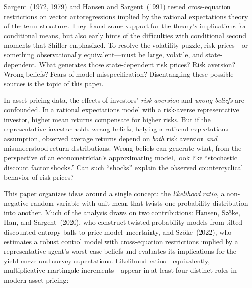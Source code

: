 \documentclass[12pt]{article}
\theoremstyle{definition}
\begin{document}
Sargent~(1972, 1979) and Hansen and Sargent~(1991) tested cross-equation restrictions on vector autoregressions implied by the rational expectations theory of the term structure. They found some support for the theory's implications for conditional means, but also early hints of the difficulties with conditional second moments that Shiller emphasized. To resolve the volatility puzzle, risk prices---or something observationally equivalent---must be large, volatile, and state-dependent. What generates those state-dependent risk prices? Risk aversion? Wrong beliefs? Fears of model misspecification? Disentangling these possible sources is the topic of this paper.

In asset pricing data, the effects of investors' \emph{risk aversion} and \emph{wrong beliefs} are
confounded.  In a rational expectations model with a
risk-averse representative investor, higher mean returns compensate for
higher risks.  But if the representative investor holds wrong beliefs, belying a rational expectations assumption,
observed average returns depend on \emph{both} risk aversion \emph{and}
misunderstood return distributions.  Wrong beliefs can generate what, from the perspective of an econometrician's approximating model, look
like ``stochastic discount factor shocks.'' Can such ``shocks'' explain the observed countercyclical behavior of risk prices?


This paper organizes ideas around a single concept: the
\emph{likelihood ratio}, a non-negative random variable with unit mean
that twists one probability distribution into another.
Much of the analysis draws on two contributions:
Hansen, Sz\H{o}ke, Han, and Sargent~(2020), who construct
twisted probability models from tilted discounted entropy balls to
price model uncertainty, and Sz\H{o}ke~(2022), who estimates a
robust control model with cross-equation restrictions implied by a
representative agent's worst-case beliefs and evaluates its
implications for the yield curve and survey expectations.
Likelihood
ratios---equivalently, multiplicative martingale increments---appear in
at least four distinct roles in modern asset pricing:
\end{document}
